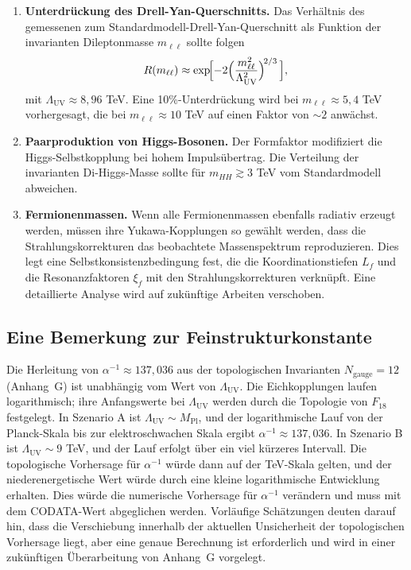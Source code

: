 \documentclass[11pt,a4paper]{article}
\newcommand{\Mpl}{M_{\mathrm{Pl}}}
\newcommand{\LUV}{\Lambda_{\mathrm{UV}}}
\theoremstyle{remark}
\begin{document}
	\begin{enumerate}[label=(\arabic*)]
		\item \textbf{Unterdrückung des Drell-Yan-Querschnitts.} Das Verhältnis des gemessenen zum Standardmodell-Drell-Yan-Querschnitt als Funktion der invarianten Dileptonmasse \(m_{\ell\ell}\) sollte folgen
		\[
		R(m_{\ell\ell}) \approx \exp\!\Bigl[-2\Bigl(\frac{m_{\ell\ell}^2}{\LUV^2}\Bigr)^{\!2/3}\,\Bigr],
		\]
		mit \(\LUV \approx 8,96\) TeV. Eine 10\%-Unterdrückung wird bei \(m_{\ell\ell} \approx 5,4\) TeV vorhergesagt, die bei \(m_{\ell\ell} \approx 10\) TeV auf einen Faktor von \(\sim 2\) anwächst.
		
		\item \textbf{Paarproduktion von Higgs-Bosonen.} Der Formfaktor modifiziert die Higgs-Selbstkopplung bei hohem Impulsübertrag. Die Verteilung der invarianten Di-Higgs-Masse sollte für \(m_{HH} \gtrsim 3\) TeV vom Standardmodell abweichen.
		
		\item \textbf{Fermionenmassen.} Wenn alle Fermionenmassen ebenfalls radiativ erzeugt werden, müssen ihre Yukawa-Kopplungen so gewählt werden, dass die Strahlungskorrekturen das beobachtete Massenspektrum reproduzieren. Dies legt eine Selbstkonsistenzbedingung fest, die die Koordinationstiefen \(L_f\) und die Resonanzfaktoren \(\xi_f\) mit den Strahlungskorrekturen verknüpft. Eine detaillierte Analyse wird auf zukünftige Arbeiten verschoben.
	\end{enumerate}
	
	\subsection{Eine Bemerkung zur Feinstrukturkonstante}
	
	Die Herleitung von \(\alpha^{-1} \approx 137,036\) aus der topologischen Invarianten \(N_{\mathrm{gauge}} = 12\) (Anhang~G) ist unabhängig vom Wert von \(\LUV\). Die Eichkopplungen laufen logarithmisch; ihre Anfangswerte bei \(\LUV\) werden durch die Topologie von \(F_{18}\) festgelegt. In Szenario A ist \(\LUV \sim \Mpl\), und der logarithmische Lauf von der Planck-Skala bis zur elektroschwachen Skala ergibt \(\alpha^{-1} \approx 137,036\). In Szenario B ist \(\LUV \sim 9\) TeV, und der Lauf erfolgt über ein viel kürzeres Intervall. Die topologische Vorhersage für \(\alpha^{-1}\) würde dann auf der TeV-Skala gelten, und der niederenergetische Wert würde durch eine kleine logarithmische Entwicklung erhalten. Dies würde die numerische Vorhersage für \(\alpha^{-1}\) verändern und muss mit dem CODATA-Wert abgeglichen werden. Vorläufige Schätzungen deuten darauf hin, dass die Verschiebung innerhalb der aktuellen Unsicherheit der topologischen Vorhersage liegt, aber eine genaue Berechnung ist erforderlich und wird in einer zukünftigen Überarbeitung von Anhang~G vorgelegt.
	
\end{document}
